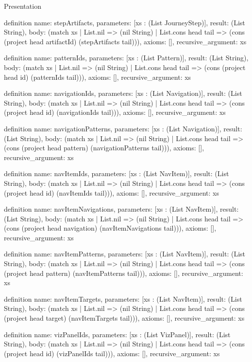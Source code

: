 \begin{lexlean}{Presentation}
\begin{semanticmodule}
definition{
  name: stepArtifacts,
  parameters: [xs : (List JourneyStep)],
  result: (List String),
  body: (match xs
    | List.nil => (nil String)
    | List.cons head tail => (cons (project head artifactId) (stepArtifacts tail))),
  axioms: [],
  recursive_argument: xs
}

definition{
  name: patternIds,
  parameters: [xs : (List Pattern)],
  result: (List String),
  body: (match xs
    | List.nil => (nil String)
    | List.cons head tail => (cons (project head id) (patternIds tail))),
  axioms: [],
  recursive_argument: xs
}

definition{
  name: navigationIds,
  parameters: [xs : (List Navigation)],
  result: (List String),
  body: (match xs
    | List.nil => (nil String)
    | List.cons head tail => (cons (project head id) (navigationIds tail))),
  axioms: [],
  recursive_argument: xs
}

definition{
  name: navigationPatterns,
  parameters: [xs : (List Navigation)],
  result: (List String),
  body: (match xs
    | List.nil => (nil String)
    | List.cons head tail => (cons (project head pattern) (navigationPatterns tail))),
  axioms: [],
  recursive_argument: xs
}

definition{
  name: navItemIds,
  parameters: [xs : (List NavItem)],
  result: (List String),
  body: (match xs
    | List.nil => (nil String)
    | List.cons head tail => (cons (project head id) (navItemIds tail))),
  axioms: [],
  recursive_argument: xs
}

definition{
  name: navItemNavigations,
  parameters: [xs : (List NavItem)],
  result: (List String),
  body: (match xs
    | List.nil => (nil String)
    | List.cons head tail => (cons (project head navigation) (navItemNavigations tail))),
  axioms: [],
  recursive_argument: xs
}

definition{
  name: navItemPatterns,
  parameters: [xs : (List NavItem)],
  result: (List String),
  body: (match xs
    | List.nil => (nil String)
    | List.cons head tail => (cons (project head pattern) (navItemPatterns tail))),
  axioms: [],
  recursive_argument: xs
}

definition{
  name: navItemTargets,
  parameters: [xs : (List NavItem)],
  result: (List String),
  body: (match xs
    | List.nil => (nil String)
    | List.cons head tail => (cons (project head target) (navItemTargets tail))),
  axioms: [],
  recursive_argument: xs
}

definition{
  name: vizPanelIds,
  parameters: [xs : (List VizPanel)],
  result: (List String),
  body: (match xs
    | List.nil => (nil String)
    | List.cons head tail => (cons (project head id) (vizPanelIds tail))),
  axioms: [],
  recursive_argument: xs
}


\end{semanticmodule}
\end{lexlean}
